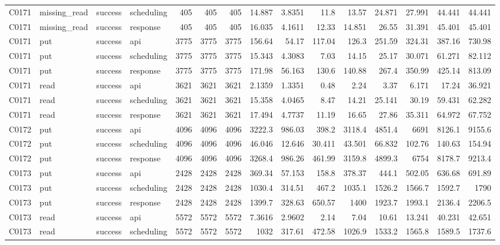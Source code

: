 \begin{landscape}
\begin{longtable}{llllrrrrrrrrrrr}
C0171 & missing\_\allowbreak{}read & success & scheduling & 405 & 405 & 405 & 14.887 & 3.8351 & 11.8 & 13.57 & 24.871 & 27.991 & 44.441 & 44.441\\
C0171 & missing\_\allowbreak{}read & success & response & 405 & 405 & 405 & 16.035 & 4.1611 & 12.33 & 14.851 & 26.55 & 31.391 & 45.401 & 45.401\\
C0171 & put & success & api & 3775 & 3775 & 3775 & 156.64 & 54.17 & 117.04 & 126.3 & 251.59 & 324.31 & 387.16 & 730.98\\
C0171 & put & success & scheduling & 3775 & 3775 & 3775 & 15.343 & 4.3083 & 7.03 & 14.15 & 25.17 & 30.071 & 61.271 & 82.112\\
C0171 & put & success & response & 3775 & 3775 & 3775 & 171.98 & 56.163 & 130.6 & 140.88 & 267.4 & 350.99 & 425.14 & 813.09\\
C0171 & read & success & api & 3621 & 3621 & 3621 & 2.1359 & 1.3351 & 0.48 & 2.24 & 3.37 & 6.171 & 17.24 & 36.921\\
C0171 & read & success & scheduling & 3621 & 3621 & 3621 & 15.358 & 4.0465 & 8.47 & 14.21 & 25.141 & 30.19 & 59.431 & 62.282\\
C0171 & read & success & response & 3621 & 3621 & 3621 & 17.494 & 4.7737 & 11.19 & 16.65 & 27.86 & 35.311 & 64.972 & 67.752\\
C0172 & put & success & api & 4096 & 4096 & 4096 & 3222.3 & 986.03 & 398.2 & 3118.4 & 4851.4 & 6691 & 8126.1 & 9155.6\\
C0172 & put & success & scheduling & 4096 & 4096 & 4096 & 46.046 & 12.646 & 30.411 & 43.501 & 66.832 & 102.76 & 140.63 & 154.94\\
C0172 & put & success & response & 4096 & 4096 & 4096 & 3268.4 & 986.26 & 461.99 & 3159.8 & 4899.3 & 6754 & 8178.7 & 9213.4\\
C0173 & put & success & api & 2428 & 2428 & 2428 & 369.34 & 57.153 & 158.8 & 378.37 & 444.1 & 502.05 & 636.68 & 691.89\\
C0173 & put & success & scheduling & 2428 & 2428 & 2428 & 1030.4 & 314.51 & 467.2 & 1035.1 & 1526.2 & 1566.7 & 1592.7 & 1790\\
C0173 & put & success & response & 2428 & 2428 & 2428 & 1399.7 & 328.63 & 650.57 & 1400 & 1923.7 & 1993.1 & 2136.4 & 2206.5\\
C0173 & read & success & api & 5572 & 5572 & 5572 & 7.3616 & 2.9602 & 2.14 & 7.04 & 10.61 & 13.241 & 40.231 & 42.651\\
C0173 & read & success & scheduling & 5572 & 5572 & 5572 & 1032 & 317.61 & 472.58 & 1026.9 & 1533.2 & 1565.8 & 1589.5 & 1737.6\\

\end{longtable}
\end{landscape}
